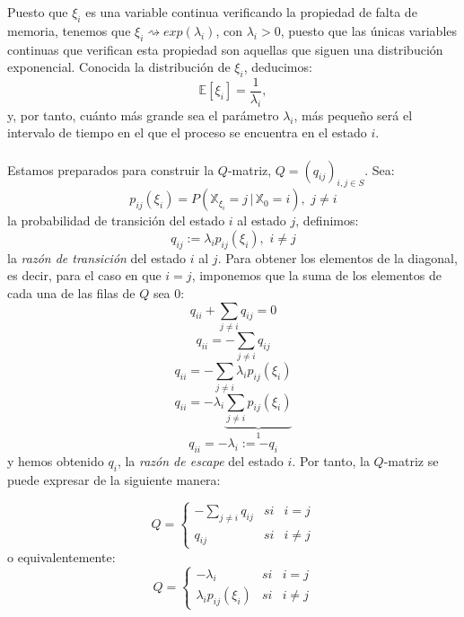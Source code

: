 \documentclass[12pt,a4paper]{article}
\begin{document}
Puesto que $\xi_i$ es una variable continua verificando la propiedad de falta de memoria, tenemos que $\xi_i\rightsquigarrow exp(\lambda_i)$, con $\lambda_i>0$, puesto que las únicas variables continuas que verifican esta propiedad son aquellas que siguen una distribución exponencial. Conocida la distribución de $\xi_i$, deducimos:
$$\mathbb{E}[\xi_i]=\dfrac{1}{\lambda_i},$$
y, por tanto, cuánto más grande sea el parámetro $\lambda_i$, más pequeño será el intervalo de tiempo en el que el proceso se encuentra en el estado $i$.
\\\\
Estamos preparados para construir la $Q$-matriz, $Q=(q_{ij})_{i,j\in S}$. Sea:
$$p_{ij}(\xi_i)=P(\mathbb{X}_{\xi_i}=j\, | \, \mathbb{X}_0=i), \,\, j\neq i$$
la probabilidad de transición del estado $i$ al estado $j$, definimos:
$$q_{ij}:=\lambda_i p_{ij}(\xi_i),\,\, i\neq j$$
la \textit{razón de transición} del estado $i$ al $j$. Para obtener los elementos de la diagonal, es decir, para el caso en que $i=j$, imponemos que la suma de los elementos de cada una de las filas de $Q$ sea $0$:
$$q_{ii}+\sum_{j\neq i}q_{ij}=0$$
$$q_{ii}=-\sum_{j\neq i}q_{ij}$$
$$q_{ii}=-\sum_{j\neq i}\lambda_i p_{ij}(\xi_i)$$
$$q_{ii}=-\lambda_i\underbrace{\sum_{j\neq i}p_{ij}(\xi_i)}_{1}$$
$$q_{ii}=-\lambda_i:=-q_i$$
y hemos obtenido $q_i$, la \textit{razón de escape} del estado $i$. Por tanto, la $Q$-matriz se puede expresar de la siguiente manera:

$$Q= \left\{ \begin{array}{lcc}
   	   	             -\sum\limits_{j\neq i}q_{ij} &   si  & i=j \\
   	   	             q_{ij} &  si & i\neq j
   	   	             \end{array} \right. $$
o equivalentemente:
$$Q= \left\{ \begin{array}{lcc}
   	   	             -\lambda_i &   si  & i=j \\
   	   	             \lambda_i p_{ij}(\xi_i) &  si & i\neq j
   	   	             \end{array} \right. $$
\end{document}
